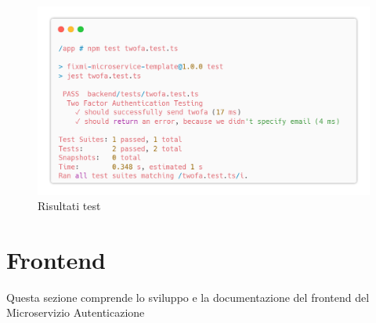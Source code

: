 \documentclass{report}
\begin{document}
\begin{figure}[H]
	\centering\includegraphics[width=1\textwidth]{images/microservizio-autenticazione/tests/twofa_test_results.png}
	\caption{Risultati test}
\end{figure}






\section{Frontend}

Questa sezione comprende lo sviluppo e la documentazione del frontend del Microservizio Autenticazione
\end{document}
